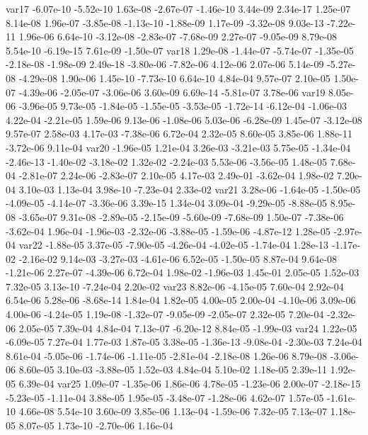 var17 -6.07e-10 -5.52e-10  1.63e-08 -2.67e-07 -1.46e-10  3.44e-09  2.34e-17  1.25e-07  8.14e-08  1.96e-07 -3.85e-08 -1.13e-10 -1.88e-09  1.17e-09 -3.32e-08  9.03e-13 -7.22e-11  1.96e-06  6.64e-10 -3.12e-08 -2.83e-07 -7.68e-09  2.27e-07 -9.05e-09  8.79e-08  5.54e-10 -6.19e-15  7.61e-09 -1.50e-07
var18  1.29e-08 -1.44e-07 -5.74e-07 -1.35e-05 -2.18e-08 -1.98e-09  2.49e-18 -3.80e-06 -7.82e-06  4.12e-06  2.07e-06  5.14e-09 -5.27e-08 -4.29e-08  1.90e-06  1.45e-10 -7.73e-10  6.64e-10  4.84e-04  9.57e-07  2.10e-05  1.50e-07 -4.39e-06 -2.05e-07 -3.06e-06  3.60e-09  6.69e-14 -5.81e-07  3.78e-06
var19  8.05e-06 -3.96e-05  9.73e-05 -1.84e-05 -1.55e-05 -3.53e-05 -1.72e-14 -6.12e-04 -1.06e-03  4.22e-04 -2.21e-05  1.59e-06  9.13e-06 -1.08e-06  5.03e-06 -6.28e-09  1.45e-07 -3.12e-08  9.57e-07  2.58e-03  4.17e-03 -7.38e-06  6.72e-04  2.32e-05  8.60e-05  3.85e-06  1.88e-11 -3.72e-06  9.11e-04
var20 -1.96e-05  1.21e-04  3.26e-03 -3.21e-03  5.75e-05 -1.34e-04 -2.46e-13 -1.40e-02 -3.18e-02  1.32e-02 -2.24e-03  5.53e-06 -3.56e-05  1.48e-05  7.68e-04 -2.81e-07  2.24e-06 -2.83e-07  2.10e-05  4.17e-03  2.49e-01 -3.62e-04  1.98e-02  7.20e-04  3.10e-03  1.13e-04  3.98e-10 -7.23e-04  2.33e-02
var21  3.28e-06 -1.64e-05 -1.50e-05 -4.09e-05 -4.14e-07 -3.36e-06  3.39e-15  1.34e-04  3.09e-04 -9.29e-05 -8.88e-05  8.95e-08 -3.65e-07  9.31e-08 -2.89e-05 -2.15e-09 -5.60e-09 -7.68e-09  1.50e-07 -7.38e-06 -3.62e-04  1.96e-04 -1.96e-03 -2.32e-06 -3.88e-05 -1.59e-06 -4.87e-12  1.28e-05 -2.97e-04
var22 -1.88e-05  3.37e-05 -7.90e-05 -4.26e-04 -4.02e-05 -1.74e-04  1.28e-13 -1.17e-02 -2.16e-02  9.14e-03 -3.27e-03 -4.61e-06  6.52e-05 -1.50e-05  8.87e-04  9.64e-08 -1.21e-06  2.27e-07 -4.39e-06  6.72e-04  1.98e-02 -1.96e-03  1.45e-01  2.05e-05  1.52e-03  7.32e-05  3.13e-10 -7.24e-04  2.20e-02
var23  8.82e-06 -4.15e-05  7.60e-04  2.92e-04  6.54e-06  5.28e-06 -8.68e-14  1.84e-04  1.82e-05  4.00e-05  2.00e-04 -4.10e-06  3.09e-06  4.00e-06 -4.24e-05  1.19e-08 -1.32e-07 -9.05e-09 -2.05e-07  2.32e-05  7.20e-04 -2.32e-06  2.05e-05  7.39e-04  4.84e-04  7.13e-07 -6.20e-12  8.84e-05 -1.99e-03
var24  1.22e-05 -6.09e-05  7.27e-04  1.77e-03  1.87e-05  3.38e-05 -1.36e-13 -9.08e-04 -2.30e-03  7.24e-04  8.61e-04 -5.05e-06 -1.74e-06 -1.11e-05 -2.81e-04 -2.18e-08  1.26e-06  8.79e-08 -3.06e-06  8.60e-05  3.10e-03 -3.88e-05  1.52e-03  4.84e-04  5.10e-02  1.18e-05  2.39e-11  1.92e-05  6.39e-04
var25  1.09e-07 -1.35e-06  1.86e-06  4.78e-05 -1.23e-06  2.00e-07 -2.18e-15 -5.23e-05 -1.11e-04  3.88e-05  1.95e-05 -3.48e-07 -1.28e-06  4.62e-07  1.57e-05 -1.61e-10  4.66e-08  5.54e-10  3.60e-09  3.85e-06  1.13e-04 -1.59e-06  7.32e-05  7.13e-07  1.18e-05  8.07e-05  1.73e-10 -2.70e-06  1.16e-04
